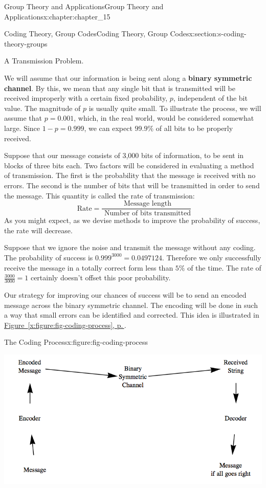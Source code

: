 \documentclass[twoside,10pt,]{book}
\newcommand{\xreffont}{\relax}
\newcommand{\terminology}[1]{\textbf{#1}}
\numberwithin{equation}{section}
\begin{document}
\begin{chapterptx}{Group Theory and Applications}{}{Group Theory and Applications}{}{}{x:chapter:chapter_15}
\begin{sectionptx}{Coding Theory, Group Codes}{}{Coding Theory, Group Codes}{}{}{x:section:s-coding-theory-groups}
\begin{introduction}{A Transmission Problem.}
\par
We will assume that our information is being sent along a \terminology{binary symmetric channel}. By this, we mean that any single bit that is transmitted will be received improperly with a certain fixed probability, \(p\), independent of the bit value.   The magnitude of \(p\) is usually quite small. To illustrate the process, we will assume that \(p = 0.001\), which, in the real world, would be considered somewhat large. Since \(1 - p = 0.999\), we can expect \(99.9\%\) of all bits to be properly received.%
\par
Suppose that our message consists of 3,000 bits of information, to be sent in blocks of three bits each. Two factors will be considered in evaluating a method of transmission. The first is the probability that the message is received with no errors. The second is the number of bits that will be transmitted in order to send the message. This quantity is called the rate of transmission:%
\begin{equation*}
\textrm{ Rate}= \frac{\textrm{ Message length}}{\textrm{ Number of bits transmitted}}
\end{equation*}
As you might expect, as we devise methods to improve the probability of success, the rate will decrease.%
\par
Suppose that we ignore the noise and transmit the message without any coding. The probability of success is \(0.999^{3000}= 0.0497124\).  Therefore we only successfully receive the message in a totally correct form less than \(5\%\) of the time.  The rate of \(\frac{3000}{3000} = 1\) certainly doesn't offset this poor probability.%
\par
Our strategy  for improving our chances of success will be to send an encoded message across the binary symmetric channel. The encoding will be done in such a way that small errors can be identified and corrected. This idea is illustrated in \hyperref[x:figure:fig-coding-process]{Figure~{\xreffont\ref{x:figure:fig-coding-process}}, p.\,\pageref{x:figure:fig-coding-process}}.%
\begin{figureptx}{The Coding Process}{x:figure:fig-coding-process}{}%
\begin{image}{0.1}{0.8}{0.1}%
\includegraphics[width=\linewidth]{images/fig-coding-process.png}

\end{image}
\end{figureptx}
\end{introduction}
\end{sectionptx}
\end{chapterptx}
\end{document}
